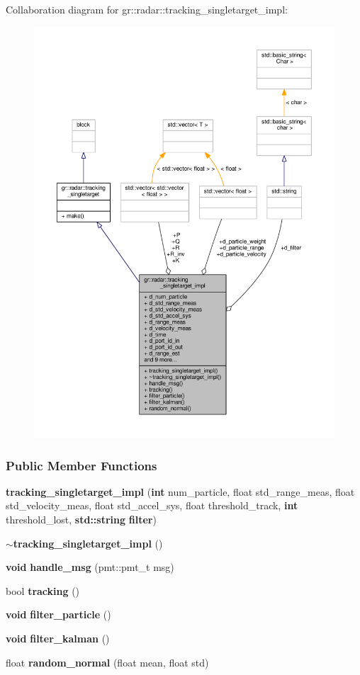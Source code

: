 Collaboration diagram for gr\+:\+:radar\+:\+:tracking\+\_\+singletarget\+\_\+impl\+:
\nopagebreak
\begin{figure}[H]
\begin{center}
\leavevmode
\includegraphics[width=350pt]{de/de7/classgr_1_1radar_1_1tracking__singletarget__impl__coll__graph}
\end{center}
\end{figure}
\subsubsection*{Public Member Functions}
\begin{DoxyCompactItemize}
\item 
{\bf tracking\+\_\+singletarget\+\_\+impl} ({\bf int} num\+\_\+particle, float std\+\_\+range\+\_\+meas, float std\+\_\+velocity\+\_\+meas, float std\+\_\+accel\+\_\+sys, float threshold\+\_\+track, {\bf int} threshold\+\_\+lost, {\bf std\+::string} {\bf filter})
\item 
{\bf $\sim$tracking\+\_\+singletarget\+\_\+impl} ()
\item 
{\bf void} {\bf handle\+\_\+msg} (pmt\+::pmt\+\_\+t msg)
\item 
bool {\bf tracking} ()
\item 
{\bf void} {\bf filter\+\_\+particle} ()
\item 
{\bf void} {\bf filter\+\_\+kalman} ()
\item 
float {\bf random\+\_\+normal} (float mean, float std)
\end{DoxyCompactItemize}
